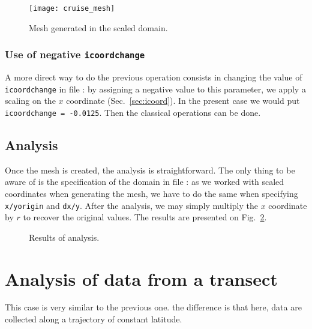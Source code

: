 \begin{figure}[H]
\centering
\texttt{[image: cruise\_mesh]}
\caption{Mesh generated in the scaled domain.\label{fig:mesh}}
\end{figure}

\subsubsection{Use of negative \texttt{icoordchange}}

A more direct way to do the previous operation consists in changing the value of \texttt{icoord\-change} in file : by assigning a negative value to this parameter, we apply a scaling on the $x$ coordinate (Sec.~\ref{sec:icoord}). In the present case we would put\, \texttt{icoordchange = -0.0125}. Then the classical \diva operations can be done.



\subsection{Analysis}

Once the mesh is created, the analysis is straightforward. The only thing to be aware of is the specification of the domain in file : as we worked with scaled coordinates when generating the mesh, we have to do the same when specifying \texttt{x/yorigin} and \texttt{dx/y}. After the analysis, we may simply multiply the $x$ coordinate by $r$ to recover the original values. The results are presented on Fig.~\ref{fig:analysis}.  

 
\begin{figure}[htpb]
\centering
{}
\caption{Results of analysis.\label{fig:analysis}}
\end{figure}





\section{Analysis of data from a transect}

This case is very similar to the previous one. the difference is that here, data are collected along a trajectory of constant latitude.
